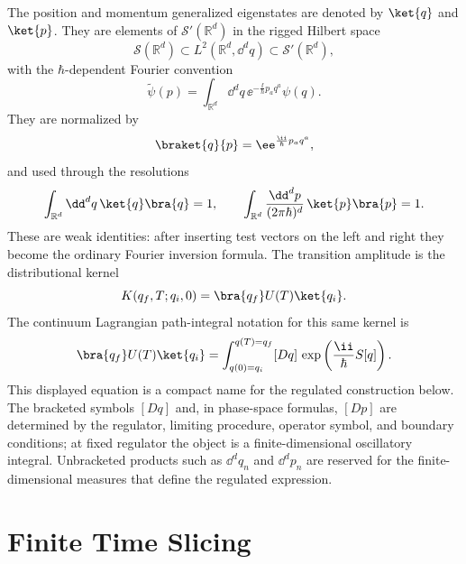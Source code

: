 \begin{definition}
\label{def:position-momentum-rigging-kernel-notation}
The position and momentum generalized eigenstates are denoted by
\(\ket{q}\) and \(\ket{p}\). They are elements of
\(\mathcal S'(\mathbb R^d)\) in the rigged Hilbert space
\[
  \mathcal S(\mathbb R^d)
  \subset
  L^2(\mathbb R^d,\dd^dq)
  \subset
  \mathcal S'(\mathbb R^d),
\]
with the \(\hbar\)-dependent Fourier convention
\[
  \widetilde\psi(p)
  =
  \int_{\mathbb R^d}\dd^dq\,
  \ee^{-\frac{\ii}{\hbar}p_aq^a}\psi(q).
\]
They are normalized by
\[
  \braket{q}{p}=\ee^{\frac{\ii}{\hbar}p_aq^a},
\]
and used through the resolutions
\[
  \int_{\mathbb R^d}\dd^dq\,\ket{q}\bra{q}=1,
  \qquad
  \int_{\mathbb R^d}\frac{\dd^dp}{(2\pi\hbar)^d}\,\ket{p}\bra{p}=1.
\]
These are weak identities: after inserting test vectors on the left and right
they become the ordinary Fourier inversion formula.
The transition amplitude is the distributional kernel
\[
  K(q_f,T;q_i,0)
  =
  \bra{q_f}U(T)\ket{q_i}.
\]
The continuum Lagrangian path-integral notation for this same kernel is
\[
  \bra{q_f}U(T)\ket{q_i}
  =
  \int_{q(0)=q_i}^{q(T)=q_f} [Dq]\,
  \exp\left(\frac{\ii}{\hbar}S[q]\right).
\]
This displayed equation is a compact name for the regulated construction
below.  The bracketed symbols \([Dq]\) and, in phase-space formulas, \([Dp]\)
are determined by the regulator, limiting procedure, operator symbol, and
boundary conditions; at fixed regulator the object is a finite-dimensional
oscillatory integral.  Unbracketed products such as \(\dd^dq_n\) and
\(\dd^dp_n\) are reserved for the finite-dimensional measures that define the
regulated expression.
\end{definition}

\section{Finite Time Slicing}

